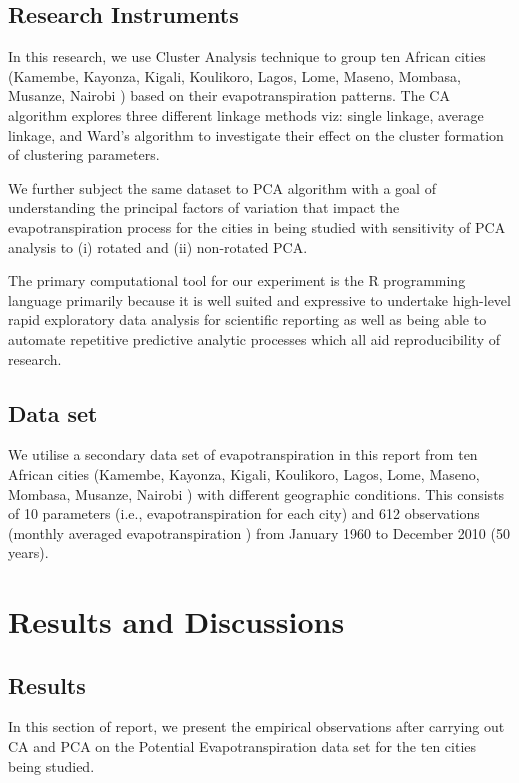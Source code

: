 \documentclass[12pt,a4paper]{article}
\begin{document}
\subsection{Research Instruments}
In this research, we use Cluster Analysis technique to group ten African cities (Kamembe, Kayonza, Kigali, Koulikoro, Lagos, Lome, Maseno, Mombasa, Musanze, Nairobi ) based on their evapotranspiration patterns.
The CA algorithm explores three different linkage methods viz: single linkage,  average linkage,  and Ward’s algorithm to investigate their effect on the cluster formation of clustering parameters.

We further subject the same dataset to PCA algorithm with a goal of understanding the principal factors of variation that impact the evapotranspiration process for the cities in being studied with  sensitivity
of PCA analysis to (i) rotated and (ii) non-rotated PCA.

The primary computational tool for our experiment is the R programming language primarily because it is well suited and expressive to undertake high-level rapid exploratory data analysis for scientific reporting as well as being able to automate repetitive predictive analytic processes which all aid reproducibility of research.
\subsection{Data set}
We utilise a secondary data set of evapotranspiration in this report from ten African cities (Kamembe,  Kayonza,  Kigali,  Koulikoro,  Lagos,  Lome,  Maseno,  Mombasa,  Musanze,  Nairobi ) with different geographic conditions.  This consists of 10 parameters (i.e.,   evapotranspiration for each city) and 612 observations (monthly averaged evapotranspiration ) from January 1960 to December 2010 (50 years).
\pagebreak
\section{Results and Discussions}
\subsection{Results}
In this section of report, we present the empirical observations after carrying out CA and PCA on the Potential Evapotranspiration data set for the ten cities being studied.
\end{document}

